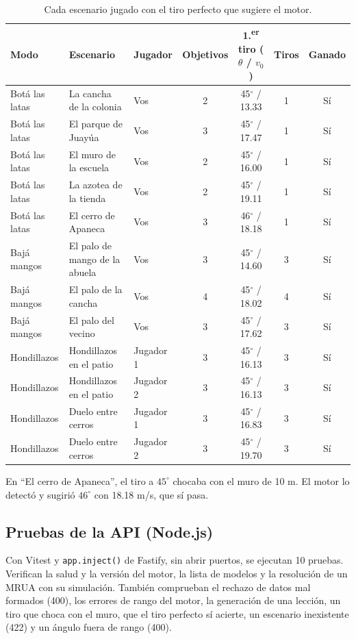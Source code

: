 \documentclass[11pt,letterpaper]{article}
\begin{document}
\begin{table}[H]
\centering
\footnotesize
\begin{tabular}{@{}lllcccc@{}}
\toprule
\textbf{Modo} & \textbf{Escenario} & \textbf{Jugador} & \textbf{Objetivos} & \textbf{1.\textsuperscript{er} tiro ($\theta$ / $v_0$)} & \textbf{Tiros} & \textbf{Ganado} \\
\midrule
Botá las latas & La cancha de la colonia & Vos & 2 & 45$^\circ$ / 13.33 & 1 & Sí \\
Botá las latas & El parque de Juayúa & Vos & 3 & 45$^\circ$ / 17.47 & 1 & Sí \\
Botá las latas & El muro de la escuela & Vos & 2 & 45$^\circ$ / 16.00 & 1 & Sí \\
Botá las latas & La azotea de la tienda & Vos & 2 & 45$^\circ$ / 19.11 & 1 & Sí \\
Botá las latas & El cerro de Apaneca & Vos & 3 & 46$^\circ$ / 18.18 & 1 & Sí \\
Bajá mangos & El palo de mango de la abuela & Vos & 3 & 45$^\circ$ / 14.60 & 3 & Sí \\
Bajá mangos & El palo de la cancha & Vos & 4 & 45$^\circ$ / 18.02 & 4 & Sí \\
Bajá mangos & El palo del vecino & Vos & 3 & 45$^\circ$ / 17.62 & 3 & Sí \\
Hondillazos & Hondillazos en el patio & Jugador 1 & 3 & 45$^\circ$ / 16.13 & 3 & Sí \\
Hondillazos & Hondillazos en el patio & Jugador 2 & 3 & 45$^\circ$ / 16.13 & 3 & Sí \\
Hondillazos & Duelo entre cerros & Jugador 1 & 3 & 45$^\circ$ / 16.83 & 3 & Sí \\
Hondillazos & Duelo entre cerros & Jugador 2 & 3 & 45$^\circ$ / 19.70 & 3 & Sí \\
\bottomrule
\end{tabular}
\caption{Cada escenario jugado con el tiro perfecto que sugiere el motor.}
\label{tab:juego}
\end{table}

En ``El cerro de Apaneca'', el tiro a $45^\circ$ chocaba con el muro de 10 m. El motor lo detectó y sugirió $46^\circ$ con 18.18 m/s, que sí pasa.

\subsection{Pruebas de la API (Node.js)}

Con Vitest y \texttt{app.inject()} de Fastify, sin abrir puertos, se ejecutan 10 pruebas. Verifican la salud y la versión del motor, la lista de modelos y la resolución de un MRUA con su simulación. También comprueban el rechazo de datos mal formados (400), los errores de rango del motor, la generación de una lección, un tiro que choca con el muro, que el tiro perfecto sí acierte, un escenario inexistente (422) y un ángulo fuera de rango (400).
\end{document}
